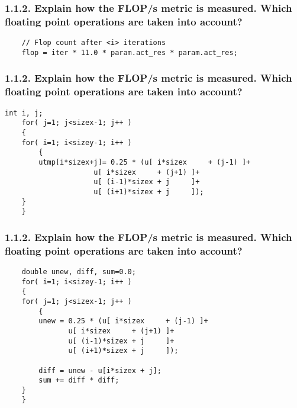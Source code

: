 \begin{frame}[fragile]
\frametitle{1.1.2. Explain how the FLOP/s metric is measured. Which floating point operations are taken into account?}
\begin{lstlisting}
	// Flop count after <i> iterations
	flop = iter * 11.0 * param.act_res * param.act_res;
\end{lstlisting}
\end{frame}
\begin{frame}[fragile]
\frametitle{1.1.2. Explain how the FLOP/s metric is measured. Which floating point operations are taken into account?}
\begin{lstlisting}
int i, j;
    for( j=1; j<sizex-1; j++ )
    {
	for( i=1; i<sizey-1; i++ )
        {
	    utmp[i*sizex+j]= 0.25 * (u[ i*sizex     + (j-1) ]+
				     u[ i*sizex     + (j+1) ]+
				     u[ (i-1)*sizex + j     ]+
				     u[ (i+1)*sizex + j     ]);
	}
    }
\end{lstlisting}
\end{frame}
\begin{frame}[fragile]
\frametitle{1.1.2. Explain how the FLOP/s metric is measured. Which floating point operations are taken into account?}
\begin{lstlisting}
    double unew, diff, sum=0.0;
	for( i=1; i<sizey-1; i++ )
    {
	for( j=1; j<sizex-1; j++ )
        {
	    unew = 0.25 * (u[ i*sizex     + (j-1) ]+
			   u[ i*sizex     + (j+1) ]+
			   u[ (i-1)*sizex + j     ]+
			   u[ (i+1)*sizex + j     ]);

	    diff = unew - u[i*sizex + j];
	    sum += diff * diff; 
	}
    }
\end{lstlisting}
\end{frame}